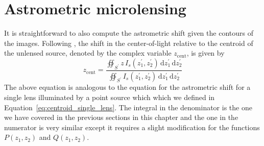 \documentclass[12pt,dvipsnames]{report}
\newcommand{\ud}{\,\mathrm{d}}
\begin{document}
\section{Astrometric microlensing}
It is straightforward to also compute the astrometric shift given the contours of the images.
Following  \citet{1998A&A...333L..79D}, the shift in the center-of-light relative to the 
centroid of the unlensed source, denoted by the complex variable $z_\mathrm{cent}$, is given by 
\begin{equation}
    z_\mathrm{cent} = \frac{\oiint_{{S}^\prime}z\,I_s(z_1^\prime,z_2^\prime)\ud z_1^\prime\ud z_2^\prime}{
    \oiint_{{S}^\prime}I_s(z_1^\prime,z_2^\prime)\ud z_1^\prime\ud z_2^\prime}{
    }
    \label{eq:centroid_shift}
\end{equation}
The above equation is analogous to the equation for the astrometric shift for a single lens 
illuminated by a point source which which we defined in 
Equation~\ref{eq:centroid_single_lens}.
The integral in the denominator is the one we have covered in the previous sections in this chapter 
and the one in the numerator is very similar except it requires a slight modification for the 
functions $P(z_1,z_2)$ and $Q(z_1,z_2)$. 
\end{document}
